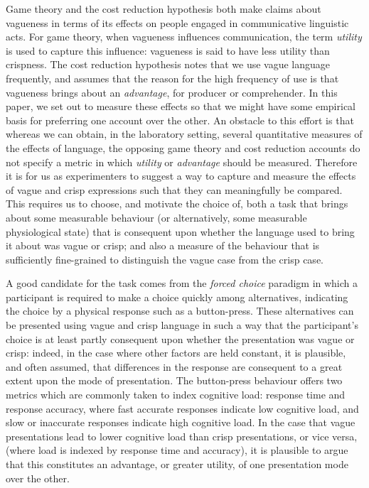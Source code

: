 \documentclass[man,floatmark]{apa}
\begin{document}
Game theory and the cost reduction hypothesis both make claims about vagueness in terms of its effects on people engaged in communicative linguistic acts. For game theory, when vagueness influences communication, the term \emph{utility} is used to capture this influence: vagueness is said to have less utility than crispness. The cost reduction hypothesis notes that we use vague language frequently, and assumes that the reason for the high frequency of use is that vagueness brings about an \emph{advantage}, for producer or comprehender. In this paper, we set out to measure these effects so that we might have some empirical basis for preferring one account over the other. An obstacle to this effort is that whereas we can obtain, in the laboratory setting, several quantitative measures of the effects of language, the opposing game theory and cost reduction accounts do not specify a metric in which \emph{utility} or \emph{advantage} should be measured. Therefore it is for us as experimenters to suggest a way to capture and measure the effects of vague and crisp expressions such that they can meaningfully be compared. This requires us to choose, and motivate the choice of, both a task that brings about some measurable behaviour (or alternatively, some measurable physiological state) that is consequent upon whether the language used to bring it about was vague or crisp; and also a measure of the behaviour that is sufficiently fine-grained to distinguish the vague case from the crisp case.

A good candidate for the task comes from the \emph{forced choice} paradigm in which a participant is required to make a choice quickly among alternatives, indicating the choice by a physical response such as a button-press. These alternatives can be presented using vague and crisp language in such a way that the participant's choice is at least partly consequent upon whether the presentation was vague or crisp: indeed, in the case where other factors are held constant, it is plausible, and often assumed, that differences in the response are consequent to a great extent upon the mode of presentation. The button-press behaviour offers two metrics which are commonly taken to index cognitive load: response time and response accuracy, where fast accurate responses indicate low cognitive load, and slow or inaccurate responses indicate high cognitive load. In the case that vague presentations lead to lower cognitive load than crisp presentations, or vice versa, (where load is indexed by response time and accuracy), it is plausible to argue that this constitutes an advantage, or greater utility, of one presentation mode over the other.
\end{document}
